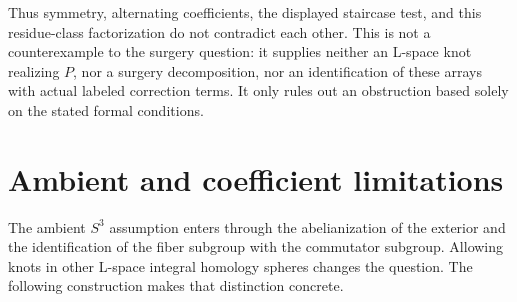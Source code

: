 \documentclass[11pt]{article}
\theoremstyle{remark}
\begin{document}
Thus symmetry, alternating coefficients, the displayed staircase test, and this residue-class factorization do not contradict each other. This is not a counterexample to the surgery question: it supplies neither an L-space knot realizing $P$, nor a surgery decomposition, nor an identification of these arrays with actual labeled correction terms. It only rules out an obstruction based solely on the stated formal conditions.

\section{Ambient and coefficient limitations}\label{sec:limits}

The ambient $S^3$ assumption enters through the abelianization of the exterior and the identification of the fiber subgroup with the commutator subgroup. Allowing knots in other L-space integral homology spheres changes the question. The following construction makes that distinction concrete.
\end{document}
